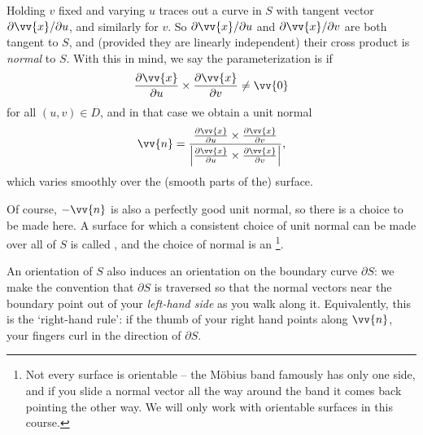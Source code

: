Holding $v$ fixed and varying $u$ traces out a curve in $S$ with tangent vector $\partial \vv{x}/\partial u$, and similarly for $v$. So $\partial \vv{x} / \partial u$ and $\partial \vv{x}/\partial v$ are both tangent to $S$, and (provided they are linearly independent) their cross product is \emph{normal} to $S$. With this in mind, we say the parameterization is  if
$$
\frac{\partial \vv{x}}{\partial u} \times \frac{\partial \vv{x}}{\partial v} \neq \vv{0}
$$
for all $(u, v) \in D$, and in that case we obtain a unit normal
$$
\vv{n} = \frac{\frac{\partial \vv{x}}{\partial u} \times \frac{\partial \vv{x}}{\partial v}}{\left|\frac{\partial \vv{x}}{\partial u} \times \frac{\partial \vv{x}}{\partial v}\right|},
$$
which varies smoothly over the (smooth parts of the) surface.

Of course, $-\vv{n}$ is also a perfectly good unit normal, so there is a choice to be made here. A surface for which a consistent choice of unit normal can be made over all of $S$ is called , and the choice of normal is an \footnote{Not every surface is orientable -- the M\"obius band famously has only one side, and if you slide a normal vector all the way around the band it comes back pointing the other way. We will only work with orientable surfaces in this course.}.

An orientation of $S$ also induces an orientation on the boundary curve $\partial S$: we make the convention that $\partial S$ is traversed so that the normal vectors near the boundary point out of your \emph{left-hand side} as you walk along it. Equivalently, this is the `right-hand rule': if the thumb of your right hand points along $\vv{n}$, your fingers curl in the direction of $\partial S$.

\begin{center}
\end{center}

